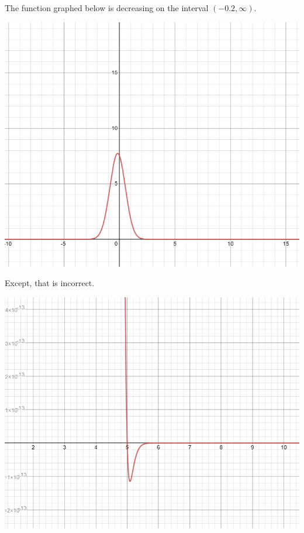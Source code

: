 \documentclass{ximera}
\begin{document}
\begin{example}


The function graphed below is decreasing on the interval $(-0.2, \infty)$.

\begin{image}
\includegraphics{pics/graph_3A.png}
\end{image}




Except, that is incorrect.

\begin{image}
\includegraphics{pics/graph_3B.png}
\end{image}



\end{example}
\end{document}
